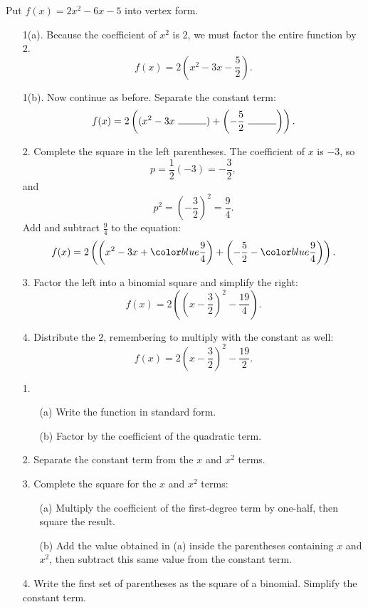 \documentclass{ximera}
\begin{document}
\begin{example} 
Put $f(x) = 2x^2 - 6x - 5$ into vertex form.
\begin{explanation}
\begin{enumerate}
    \item[1(a).] Because the coefficient of $x^2$ is $2$, we must factor the entire function by $2$.
    $$
    f(x) = 2 \left(x^2 - 3x - \frac{5}{2} \right).
    $$
    \item[1(b).] Now continue as before. Separate the constant term:
    $$
        f(x) = 2\left((x^2 - 3x\ \rule{1cm}{0.15mm}) + \left(-\frac{5}{2}\ \rule{1cm}{0.15mm}\right)\right).
    $$
    \item[2.] Complete the square in the left parentheses. The coefficient of $x$ is $-3$, so
    $$
        p = \frac{1}{2}(-3) = -\frac{3}{2},
    $$
    and
    $$
        p^2 = \left(-\frac{3}{2}\right)^2 = \frac{9}{4}.
    $$
    Add and subtract $\frac{9}{4}$ to the equation:
    $$
        f(x) = 2\left(\left(x^2 - 3x +\substitute{\frac{9}{4}}\right) + \left(-\frac{5}{2} -\substitute{\frac{9}{4}}\right)\right).
    $$
    \item[3.] Factor the left into a binomial square and simplify the right:
    $$
        f(x) =2 \left(\left(x-\frac{3}{2}\right)^2 - \frac{19}{4}\right).
    $$
    \item[4.] Distribute the $2$, remembering to multiply with the constant as well:
    $$
        f(x) =2 \left(x-\frac{3}{2}\right)^2 - \frac{19}{2}.
    $$
\end{enumerate}
\end{explanation}
\end{example}


\begin{summary}
\begin{enumerate}
    \item[1.] \begin{enumerate}
        \item[(a)] Write the function in standard form.

        \item[(b)] Factor by the coefficient of the quadratic term.
    \end{enumerate}
    \item[2.] Separate the constant term from the $x$ and $x^2$ terms.
    \item[3.] Complete the square for the $x$ and $x^2$ terms:
    \begin{enumerate}
        \item[(a)] Multiply the coefficient of the first-degree term by one-half, then square the result.
        \item[(b)] Add the value obtained in (a) inside the parentheses containing $x$ and $x^2$, then subtract this same value from the constant term.
    \end{enumerate}
    \item[4.] Write the first set of parentheses as the square of a binomial. Simplify the constant term.
\end{enumerate}
\end{summary}
   
\end{document}
